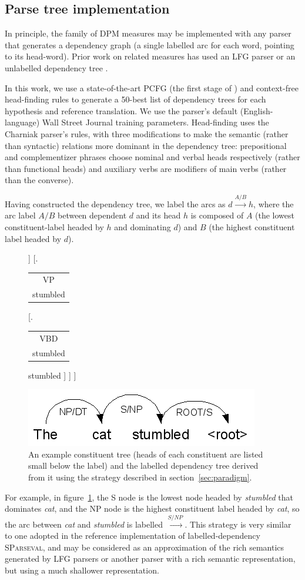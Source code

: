 \documentclass{kluwer}    %
\newcommand{\headlabel}[2]{
  \begin{tabular}{c} #1\\
    {\small #2} \end{tabular}}
\newcommand{\arclabel}[1]{\ensuremath{\stackrel{#1}{\to}}}
\begin{document}
\begin{article}
\subsection{Parse tree implementation}
In principle, the family of DPM measures may be implemented with
any parser that generates a dependency graph (a single labelled arc
for each word, pointing to its head-word). Prior work
\cite{owczarzak07evaluatingmt} on related
measures has used an LFG parser \cite{cahill04lfg} or
an unlabelled dependency tree \cite{liu05syntaxformteval}. 

In this work, we use a state-of-the-art PCFG (the first stage of
) and context-free head-finding
rules \cite{magerman95headfinding} to generate a 50-best list of
dependency trees for each hypothesis and reference translation.  We
use the parser's default (English-language) Wall Street Journal
training parameters.  Head-finding uses the Charniak parser's rules,
with three modifications to make the semantic (rather than syntactic)
relations more dominant in the dependency tree: prepositional and
complementizer phrases choose nominal and verbal heads respectively
(rather than functional heads) and auxiliary verbs are modifiers of
main verbs (rather than the converse).

Having constructed the dependency tree, we label the arcs as $d
\stackrel{A/B}{\to} h$, where the arc label $A/B$ between dependent
$d$ and its head $h$ is composed of $A$ (the lowest constituent-label
headed by $h$ and dominating $d$) and $B$ (the highest constituent
label headed by $d$).
\begin{figure}
  \Tree
  [.\headlabel{S}{stumbled}
    [.\headlabel{NP}{cat}
      [.\headlabel{DT}{the} the ]
      [.\headlabel{NN}{cat} cat ]
    ]
    [.\headlabel{VP}{stumbled} 
      [.\headlabel{VBD}{stumbled} stumbled ]
    ]
  ]
  \\
  \begin{center}
    \includegraphics[scale=0.6]{dpm-example-depextract}
  \end{center}
  \caption{An example constituent tree (heads of each constituent are
    listed small below the label) and the labelled dependency tree
    derived from it using the strategy described in
    section~\ref{sec:paradigm}.}
  \label{fig:depextract}
\end{figure}
For example, in figure~\ref{fig:depextract}, the S node is the lowest
node headed by \emph{stumbled} that dominates \emph{cat}, and the NP
node is the highest constituent label headed by \emph{cat}, so the arc
between \emph{cat} and \emph{stumbled} is labelled \arclabel{S/NP}.
%
This strategy is very similar to one adopted in the reference
implementation of labelled-dependency \textsc{SParseval}, and may be
considered as an approximation of the rich semantics generated by LFG
parsers \cite{cahill04lfg} or another parser with a rich semantic
representation, but using a much shallower representation.


\end{article}
\end{document}
